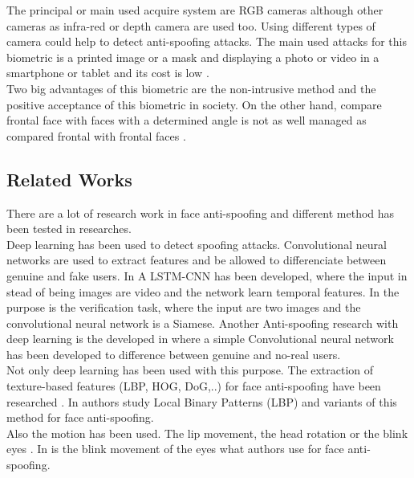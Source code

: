The principal or main used acquire system are RGB cameras although other cameras as infra-red  or depth camera are used too. Using different types of camera could help to detect anti-spoofing attacks. The main used attacks for this biometric is a printed image or a mask and displaying a photo or video in a smartphone or tablet and its cost is low \cite{distorsion}.\\

Two big advantages of this biometric are the non-intrusive method and the positive acceptance of this biometric in society. On the other hand, compare frontal face with faces with a determined angle is not as well managed as compared frontal with frontal faces \cite{survey2}.\\

\subsection{Related Works}
There are a lot of research work in face anti-spoofing and different method has been tested in researches.\\

Deep learning has been used to detect spoofing attacks. Convolutional neural networks are used to extract features and be allowed to differenciate between genuine and fake users. In \cite{LSTM-CNN} A LSTM-CNN has been developed, where the input in stead of being images are video and the network learn temporal features. In \cite{Verification} the purpose is the verification task, where the input are two images and the convolutional neural network is a Siamese. Another Anti-spoofing research with deep learning is the developed in \cite{yangLL14} where a simple Convolutional neural network has been developed to difference between genuine and no-real users.\\

Not only deep learning has been used with this purpose. The extraction of texture-based features (LBP, HOG, DoG,..) for face anti-spoofing have been researched \cite{distorsion}. In \cite{LBP_FaceAnti} authors study Local Binary Patterns (LBP) and variants of this method for face anti-spoofing.\\

Also the motion has been used. The lip movement, the head rotation or the blink eyes \cite{distorsion}. In \cite{Blink_antispoofing} is the blink movement of the eyes what authors use for face anti-spoofing.\\